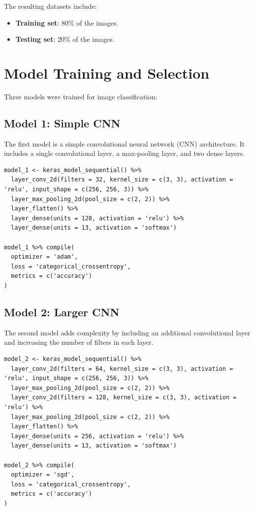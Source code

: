 \documentclass[a4paper,12pt]{article}
\begin{document}
The resulting datasets include:
\begin{itemize}
    \item \textbf{Training set}: 80\% of the images.
    \item \textbf{Testing set}: 20\% of the images.
\end{itemize}

\section{Model Training and Selection}

Three models were trained for image classification:

\subsection{Model 1: Simple CNN}
The first model is a simple convolutional neural network (CNN) architecture. It includes a single convolutional layer, a max-pooling layer, and two dense layers.

\begin{verbatim}
model_1 <- keras_model_sequential() %>%
  layer_conv_2d(filters = 32, kernel_size = c(3, 3), activation = 'relu', input_shape = c(256, 256, 3)) %>%
  layer_max_pooling_2d(pool_size = c(2, 2)) %>%
  layer_flatten() %>%
  layer_dense(units = 128, activation = 'relu') %>%
  layer_dense(units = 13, activation = 'softmax')

model_1 %>% compile(
  optimizer = 'adam',
  loss = 'categorical_crossentropy',
  metrics = c('accuracy')
)
\end{verbatim}

\subsection{Model 2: Larger CNN}
The second model adds complexity by including an additional convolutional layer and increasing the number of filters in each layer.

\begin{verbatim}
model_2 <- keras_model_sequential() %>%
  layer_conv_2d(filters = 64, kernel_size = c(3, 3), activation = 'relu', input_shape = c(256, 256, 3)) %>%
  layer_max_pooling_2d(pool_size = c(2, 2)) %>%
  layer_conv_2d(filters = 128, kernel_size = c(3, 3), activation = 'relu') %>%
  layer_max_pooling_2d(pool_size = c(2, 2)) %>%
  layer_flatten() %>%
  layer_dense(units = 256, activation = 'relu') %>%
  layer_dense(units = 13, activation = 'softmax')

model_2 %>% compile(
  optimizer = 'sgd',
  loss = 'categorical_crossentropy',
  metrics = c('accuracy')
)
\end{verbatim}
\end{document}
